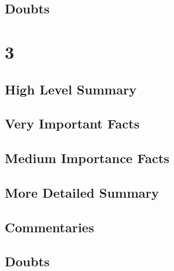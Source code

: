 \documentclass[12pt]{report}
\begin{document}
\section{Doubts}


\chapter{3}
\section{High Level Summary}

\section{Very Important Facts}

\section{Medium Importance Facts}

\section{More Detailed Summary}

\section{Commentaries}

\section{Doubts}
\end{document}
